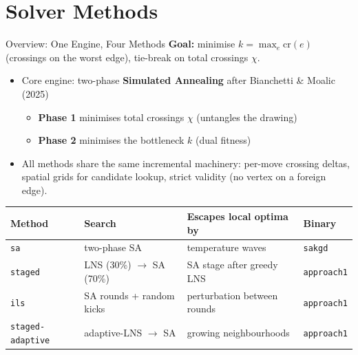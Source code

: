\section{Solver Methods}

\begin{frame}{Overview: One Engine, Four Methods}
  \textbf{Goal:} minimise $k=\max_e \mathrm{cr}(e)$ (crossings on the worst edge), tie-break on total crossings $\chi$.
  \medskip
  \begin{itemize}
    \item Core engine: two-phase \textbf{Simulated Annealing} after Bianchetti \& Moalic (2025)
      \begin{itemize}
        \item \textbf{Phase 1} minimises total crossings $\chi$ (untangles the drawing)
        \item \textbf{Phase 2} minimises the bottleneck $k$ (dual fitness)
      \end{itemize}
    \item All methods share the same incremental machinery: per-move crossing deltas,
          spatial grids for candidate lookup, strict validity (no vertex on a foreign edge).
  \end{itemize}
  \medskip
  \begin{center}
    \begin{tabular}{llll}
      \toprule
      \textbf{Method} & \textbf{Search} & \textbf{Escapes local optima by} & \textbf{Binary} \\
      \midrule
      \texttt{sa}     & two-phase SA                  & temperature waves          & \texttt{sakgd} \\
      \texttt{staged} & LNS (30\%) $\to$ SA (70\%)    & SA stage after greedy LNS  & \texttt{approach1} \\
      \texttt{ils}    & SA rounds + random kicks      & perturbation between rounds & \texttt{approach1} \\
      \texttt{staged-adaptive} & adaptive-LNS $\to$ SA & growing neighbourhoods     & \texttt{approach1} \\
      \bottomrule
    \end{tabular}
  \end{center}
\end{frame}

